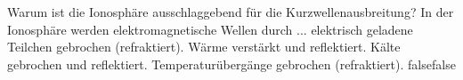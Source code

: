     {Warum ist die Ionosphäre ausschlaggebend für die Kurzwellenausbreitung? In der Ionosphäre werden elektromagnetische Wellen durch ...}
    {elektrisch geladene Teilchen gebrochen (refraktiert).}
    {Wärme verstärkt und reflektiert.}
    {Kälte gebrochen und reflektiert.}
    {Temperaturübergänge gebrochen (refraktiert).}
    {false}{false}